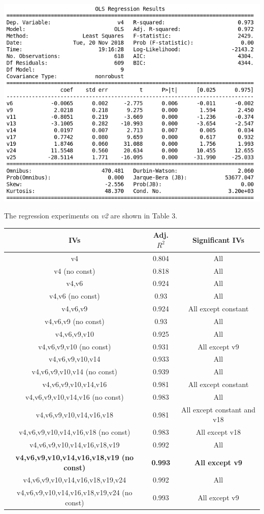 \documentclass[12pt,a4paper]{article}
\begin{document}
\includegraphics[scale=0.5]{v4_reg.png}
\begingroup
{}
\endgroup

The regression experiments on \textit{v2} are shown in Table 3.\\


\begin{tabular}{|c|c|c|}
\hline 
\textbf{IVs} & \textbf{Adj. $R^2$} & \textbf{Significant IVs} \\ 
\hline 
v4 & 0.804 & All \\ 
\hline 
v4 (no const) & 0.818 & All \\ 
\hline 
v4,v6 & 0.924 & All \\ 
\hline 
v4,v6 (no const) & 0.93 & All \\ 
\hline 
v4,v6,v9 & 0.924 & All except constant \\ 
\hline 
v4,v6,v9 (no const) & 0.93 & All \\ 
\hline 
v4,v6,v9,v10 & 0.925 & All \\ 
\hline 
v4,v6,v9,v10 (no const) & 0.931 & All except v9 \\ 
\hline 
v4,v6,v9,v10,v14 & 0.933 & All \\ 
\hline 
v4,v6,v9,v10,v14 (no const) & 0.939 & All \\ 
\hline 
v4,v6,v9,v10,v14,v16 & 0.981 & All except constant  \\ 
\hline 
v4,v6,v9,v10,v14,v16 (no const) & 0.983 & All \\ 
\hline 
v4,v6,v9,v10,v14,v16,v18 & 0.981 & All except constant and v18 \\ 
\hline 
v4,v6,v9,v10,v14,v16,v18 (no const) & 0.983 & All except v18 \\ 
\hline 
v4,v6,v9,v10,v14,v16,v18,v19 & 0.992 & All \\ 
\hline 
\textbf{v4,v6,v9,v10,v14,v16,v18,v19 (no const)} & \textbf{0.993} & \textbf{All except v9} \\ 
\hline 
v4,v6,v9,v10,v14,v16,v18,v19,v24 & 0.992 & All \\ 
\hline 
v4,v6,v9,v10,v14,v16,v18,v19,v24 (no const) & 0.993 & All except v9 \\ 
\hline 
\end{tabular}
\end{document}
